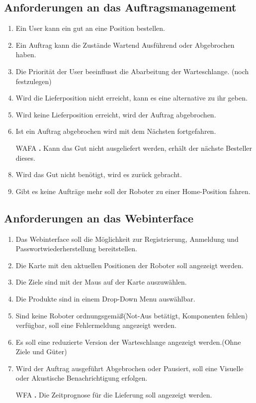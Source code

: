 \subsection{Anforderungen an das Auftragsmanagement}
\begin{enumerate}[nosep,style=sameline]
\renewcommand{\labelenumi}{ALFA \textbf{\theenumi.}}
\item Ein User kann ein gut an eine Position bestellen.
\item Ein Auftrag kann die Zustände Wartend Ausführend oder Abgebrochen haben.
\item Die Priorität der User beeinflusst die Abarbeitung der Warteschlange. (noch festzulegen)
\item Wird die Lieferposition nicht erreicht, kann es eine alternative zu ihr geben.
\item Wird keine Lieferposition erreicht, wird der Auftrag abgebrochen.
\item Ist ein Auftrag abgebrochen wird mit dem Nächsten fortgefahren.
\item[WAFA \textbf{\theenumi.}]Kann das Gut nicht ausgeliefert werden, erhält der nächste Besteller dieses.
\item Wird das Gut nicht benötigt, wird es zurück gebracht.
\item Gibt es keine Aufträge mehr soll der Roboter zu einer Home-Position fahren.
\end{enumerate}

\subsection{Anforderungen an das Webinterface}
\begin{enumerate}[nosep,style=sameline]
\renewcommand{\labelenumi}{WLFA \textbf{\theenumi.}}
\item Das Webinterface soll die Möglichkeit zur Registrierung, Anmeldung und Passwortwiederherstellung bereitstellen.
\item Die Karte mit den aktuellen Positionen der Roboter soll angezeigt werden.
\item Die Ziele sind mit der Maus auf der Karte auszuwählen.
\item Die Produkte sind in einem Drop-Down Menu auswählbar.
\item Sind keine Roboter ordnungsgemäß(Not-Aus betätigt, Komponenten fehlen)  verfügbar, soll eine Fehlermeldung angezeigt werden.
\item Es soll eine reduzierte Version der Warteschlange angezeigt werden.(Ohne Ziele und Güter)
\item Wird der Auftrag ausgeführt Abgebrochen oder Pausiert, soll eine Visuelle oder Akustische Benachrichtigung erfolgen.
\item[WFA \textbf{\theenumi.}] Die Zeitprognose für die Lieferung soll angezeigt werden.
\end{enumerate}

